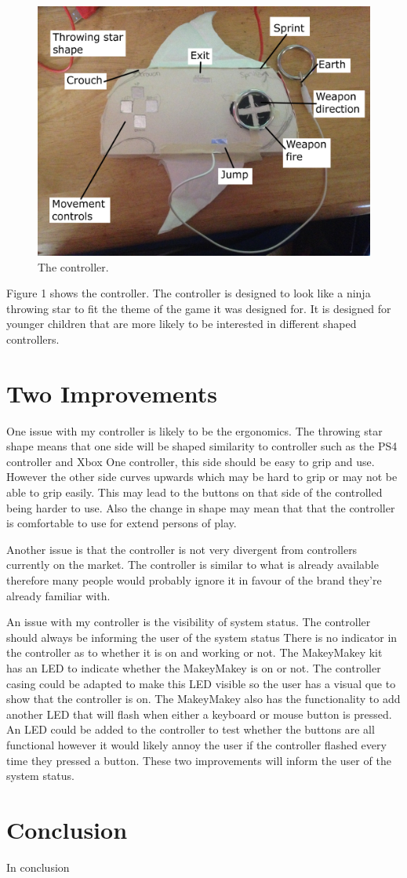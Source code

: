 \documentclass{scrartcl}
\begin{document}
\begin{figure}[h]
	\includegraphics[width=1.0\linewidth]{Controller.jpg}
	\caption{ The controller.}
\end{figure}
Figure 1 shows the controller. The controller is designed to look like a ninja throwing star to fit the theme of the game it was designed for. It is designed for younger children that are more likely to be interested in different shaped controllers.


\section{Two Improvements}

One issue with my controller is likely to be the ergonomics. The throwing star shape means that one side will be shaped similarity to controller such as the PS4 controller and Xbox One controller, this side should be easy to grip and use. However the other side curves upwards which may be hard to grip or may not be able to grip easily. This may lead to the buttons on that side of the controlled being harder to use. Also the change in shape may mean that that the controller is comfortable to use for extend persons of play.

Another issue is that the controller is not very divergent from controllers currently on the market. The controller is similar to what is already available therefore many people would probably ignore it in favour of the brand they're already familiar with. 

An issue with my controller is the visibility of system status. The controller should always be informing the user of the system status  There is no indicator in the controller as to whether it is on and working or not. The MakeyMakey kit has an LED to indicate whether the MakeyMakey is on or not. The controller casing could be adapted to make this LED visible so the user has a visual que to show that the controller is on. The MakeyMakey also has the functionality to add another LED that will flash when either a keyboard or mouse button is pressed. An LED could be added to the controller to test whether the buttons are all functional however it would likely annoy the user if the controller flashed every time they pressed a button. These two improvements will inform the user of the system status. 

\section{Conclusion}
In conclusion



	
\end{document}
